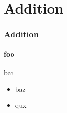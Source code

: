 \section{Addition}
\begin{frame}
  \frametitle{Addition}
  \framesubtitle{foo}
  bar
        \begin{itemize}
            \item baz
                \pause
              \item qux
        \end{itemize}
\end{frame}
